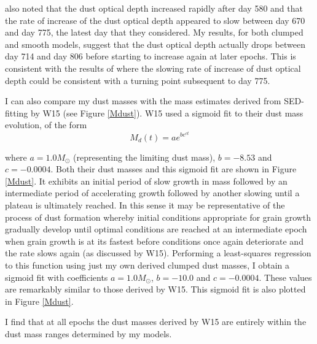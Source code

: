 \citet{Lucy1989} also noted that the dust optical depth increased rapidly 
after day 580 and that the rate of increase of the dust optical depth 
appeared to slow between day 670 and day 775, the latest day that they 
considered.  My results, for both clumped and smooth models, suggest that 
the dust optical depth actually drops between day 714 and day 806 before 
starting to increase again at later epochs.  This is consistent with the 
results of \citet{Lucy1989} where the slowing rate of increase of dust 
optical depth could be consistent with a turning point subsequent to day 
775.

I can also compare my dust masses with the mass estimates derived from 
SED-fitting by W15 (see Figure \ref{Mdust}).  W15 used a sigmoid fit to 
their dust mass evolution, of the form
\begin{equation}
M_d(t)=ae^{be^{ct}}
\end{equation}
 
\noindent where $a=1.0M_{\odot}$ (representing the limiting dust mass), 
$b=-8.53$ and $c=-0.0004$.  Both their dust masses and this sigmoid fit 
are shown in Figure \ref{Mdust}.  It exhibits an initial period of slow 
growth in mass followed by an intermediate period of accelerating growth 
followed by another slowing until a plateau is ultimately reached.  In 
this sense it may be representative of the process of dust 
formation whereby initial conditions appropriate for grain growth 
gradually develop until optimal conditions are reached at an intermediate 
epoch when grain growth is at its fastest before conditions once again 
deteriorate and the rate slows again (as discussed by W15).  Performing a 
least-squares regression to this function using just my own derived 
clumped dust masses, I obtain a sigmoid fit with coefficients 
$a=1.0M_{\odot}$, $b=-10.0$ and $c=-0.0004$.  These values are 
remarkably similar to those derived by W15.  This sigmoid fit is also 
plotted in Figure \ref{Mdust}.

I find that at all epochs the dust masses derived by W15 are entirely 
within the dust mass ranges determined by my models.

